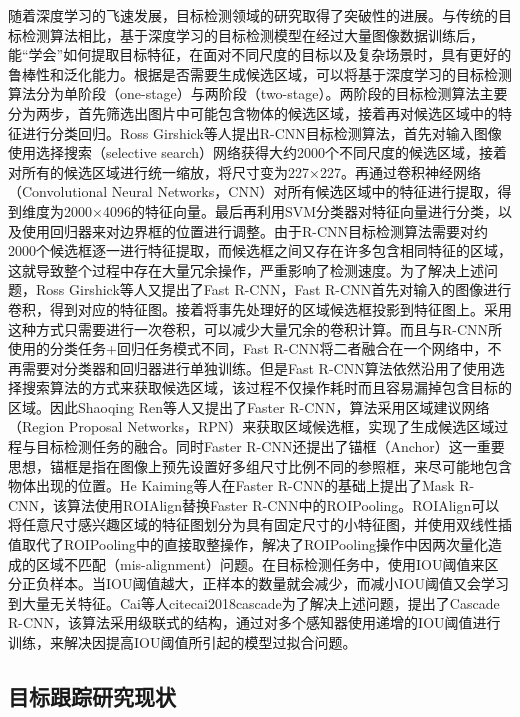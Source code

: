 随着深度学习的飞速发展，目标检测领域的研究取得了突破性的进展。与传统的目标检测算法相比，基于深度学习的目标检测模型在经过大量图像数据训练后，能“学会”如何提取目标特征，在面对不同尺度的目标以及复杂场景时，具有更好的鲁棒性和泛化能力。根据是否需要生成候选区域，可以将基于深度学习的目标检测算法分为单阶段（one-stage）与两阶段（two-stage）。两阶段的目标检测算法主要分为两步，首先筛选出图片中可能包含物体的候选区域，接着再对候选区域中的特征进行分类回归。Ross Girshick等人\cite{girshick2014rich}提出R-CNN目标检测算法，首先对输入图像使用选择搜索\cite{uijlings2013selective}（selective search）网络获得大约2000个不同尺度的候选区域，接着对所有的候选区域进行统一缩放，将尺寸变为227×227。再通过卷积神经网络（Convolutional Neural Networks，CNN）对所有候选区域中的特征进行提取，得到维度为2000×4096的特征向量。最后再利用SVM分类器对特征向量进行分类，以及使用回归器来对边界框的位置进行调整。由于R-CNN目标检测算法需要对约2000个候选框逐一进行特征提取，而候选框之间又存在许多包含相同特征的区域，这就导致整个过程中存在大量冗余操作，严重影响了检测速度。为了解决上述问题，Ross Girshick等人\cite{girshick2015fast}又提出了Fast R-CNN，Fast R-CNN首先对输入的图像进行卷积，得到对应的特征图。接着将事先处理好的区域候选框投影到特征图上。采用这种方式只需要进行一次卷积，可以减少大量冗余的卷积计算。而且与R-CNN所使用的分类任务+回归任务模式不同，Fast R-CNN将二者融合在一个网络中，不再需要对分类器和回归器进行单独训练。但是Fast R-CNN算法依然沿用了使用选择搜索算法的方式来获取候选区域，该过程不仅操作耗时而且容易漏掉包含目标的区域。因此Shaoqing Ren等人\cite{ren2015faster}又提出了Faster R-CNN，算法采用区域建议网络（Region Proposal Networks，RPN）来获取区域候选框，实现了生成候选区域过程与目标检测任务的融合。同时Faster R-CNN还提出了锚框（Anchor）这一重要思想，锚框是指在图像上预先设置好多组尺寸比例不同的参照框，来尽可能地包含物体出现的位置。He Kaiming\cite{he2017mask}等人在Faster R-CNN的基础上提出了Mask R-CNN，该算法使用ROIAlign替换Faster R-CNN中的ROIPooling。ROIAlign可以将任意尺寸感兴趣区域的特征图划分为具有固定尺寸的小特征图，并使用双线性插值取代了ROIPooling中的直接取整操作，解决了ROIPooling操作中因两次量化造成的区域不匹配（mis-alignment）问题。在目标检测任务中，使用IOU阈值来区分正负样本。当IOU阈值越大，正样本的数量就会减少，而减小IOU阈值又会学习到大量无关特征。Cai等人cite{cai2018cascade}为了解决上述问题，提出了Cascade R-CNN，该算法采用级联式的结构，通过对多个感知器使用递增的IOU阈值进行训练，来解决因提高IOU阈值所引起的模型过拟合问题。

\subsection{目标跟踪研究现状}

